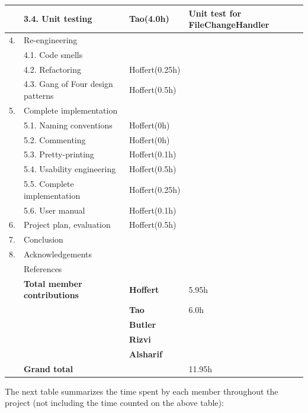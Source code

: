 \documentclass[12pt,a4paper]{article}
\begin{document}
\begin{longtable}{| p{0.2cm} p{6.25cm} | p{3cm}| p{5cm} |}
   & 3.4. Unit testing & Tao(4.0h) & Unit test for FileChangeHandler \\ \hline
  4. & Re-engineering &  &  \\ \hline
   & 4.1. Code smells &  &  \\ \hline
   & 4.2. Refactoring & Hoffert(0.25h) &  \\ \hline
   & 4.3. Gang of Four design patterns & Hoffert(0.5h) &  \\ \hline
  5. & Complete implementation &  &  \\ \hline
   & 5.1. Naming conventions & Hoffert(0h) &  \\ \hline
   & 5.2. Commenting & Hoffert(0h) &  \\ \hline
   & 5.3. Pretty-printing & Hoffert(0.1h) &  \\ \hline
   & 5.4. Usability engineering & Hoffert(0.5h) &  \\ \hline
   & 5.5. Complete implementation & Hoffert(0.25h) &  \\ \hline
   & 5.6. User manual & Hoffert(0.1h) &  \\ \hline
  6. & Project plan, evaluation & Hoffert(0.5h) &  \\ \hline
  7. & Conclusion &  &  \\ \hline
  8. & Acknowledgements &  &  \\ \hline
   & References &  &  \\ \hline
    & \textbf{Total member contributions} & \textbf{Hoffert} & 5.95h \\ \cline{3-4}
    &  & \textbf{Tao} & 6.0h \\ \cline{3-4}
    &  & \textbf{Butler} & \\ \cline{3-4}
    &  & \textbf{Rizvi} & \\ \cline{3-4}
    &  & \textbf{Alsharif} & \\ \hline
    & \textbf{Grand total} &  & 11.95h \\ \hline
\end{longtable}

The next table summarizes the time spent by each member throughout the project (not including the time counted on the above table):
\end{document}
